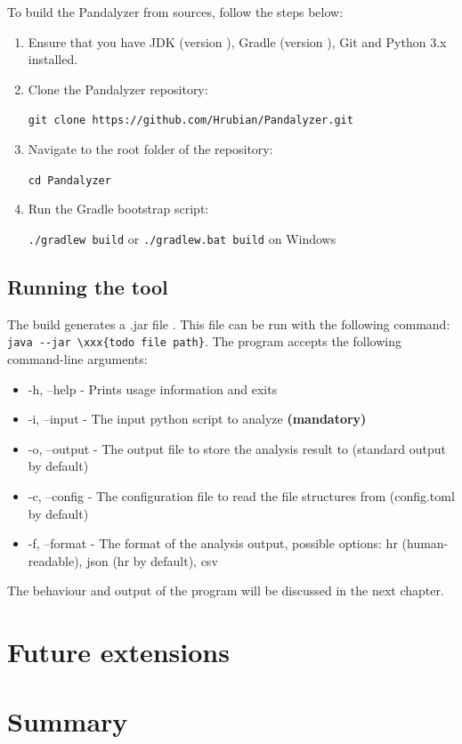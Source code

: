 To build the Pandalyzer from sources, follow the steps below:
\begin{enumerate}
    \item Ensure that you have JDK (version ), Gradle (version ), Git
    and Python 3.x installed.
    \item Clone the Pandalyzer repository:

    \verb|git clone https://github.com/Hrubian/Pandalyzer.git|
    \item Navigate to the root folder of the repository:

    \verb|cd Pandalyzer|
    \item Run the Gradle bootstrap script:

    \verb|./gradlew build| or \verb|./gradlew.bat build| on Windows
\end{enumerate}

\subsection{Running the tool}

The build generates a .jar file .
This file can be run with the following command:
\verb|java --jar \xxx{todo file path}|.
The program accepts the following command-line arguments:
\begin{itemize}
    \item -h, --help - Prints usage information and exits
    \item -i, --input - The input python script to analyze \textbf{(mandatory)}
    \item -o, --output - The output file to store the analysis result to (standard output by default)
    \item -c, --config - The configuration file to read the file structures from (config.toml by default)
    \item -f, --format - The format of the analysis output, possible options: hr (human-readable), json (hr by default), csv
\end{itemize}

The behaviour and output of the program will be discussed in the next chapter.

\section{Future extensions}

\section*{Summary}
